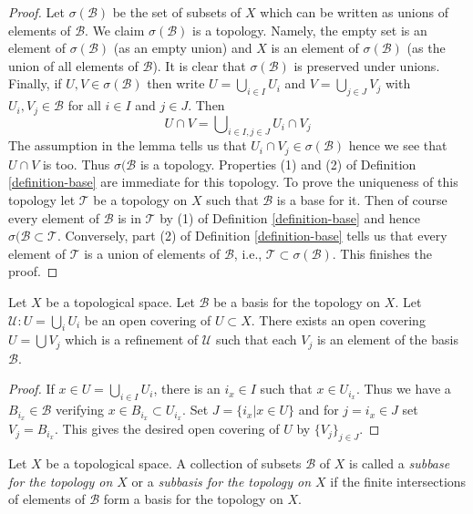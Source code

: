 \begin{proof}
Let $\sigma(\mathcal B)$ be the set of subsets of $X$ which can be written
as unions of elements of $\mathcal B$. We claim $\sigma(\mathcal{B})$
is a topology. Namely, the empty set is an element of $\sigma(\mathcal{B})$
(as an empty union) and $X$ is an element of $\sigma(\mathcal{B})$ (as the
union of all elements of $\mathcal{B}$). It is clear that $\sigma(\mathcal{B})$
is preserved under unions. Finally, if $U, V \in \sigma(\mathcal{B})$
then write $U = \bigcup_{i \in I} U_i$ and $V = \bigcup_{j \in J} V_j$
with $U_i, V_j \in \mathcal{B}$ for all $i \in I$ and $j \in J$.
Then
$$
U \cap V = \bigcup\nolimits_{i \in I, j \in J}
U_i \cap V_j
$$
The assumption in the lemma tells us that $U_i \cap V_j \in \sigma(\mathcal{B})$
hence we see that $U \cap V$ is too. Thus $\sigma(\mathcal{B}$ is a topology.
Properties (1) and (2) of Definition \ref{definition-base} are
immediate for this topology. To prove the uniqueness of this topology
let $\mathcal T$ be a topology on $X$ such that $\mathcal B$ is a base for it.
Then of course every element of $\mathcal{B}$ is in $\mathcal{T}$ by
(1) of Definition \ref{definition-base} and
hence $\sigma(\mathcal{B} \subset \mathcal{T}$. Conversely, part
(2) of Definition \ref{definition-base} tells us that every element
of $\mathcal{T}$ is a union of elements of $\mathcal{B}$, i.e.,
$\mathcal{T} \subset \sigma(\mathcal{B})$. This finishes the proof.
\end{proof}

\begin{lemma}
\label{lemma-refine-covering-basis}
Let $X$ be a topological space.
Let $\mathcal{B}$ be a basis for the topology on $X$.
Let $\mathcal{U} : U = \bigcup_i U_i$ be an open covering of
$U \subset X$. There exists an open covering $U = \bigcup V_j$
which is a refinement of $\mathcal{U}$ such that each
$V_j$ is an element of the basis $\mathcal{B}$.
\end{lemma}

\begin{proof}
If $ x \in U = \bigcup_{i\in I} U_i $, there is an $ i_x \in I $ such that
$ x \in U_{i_x} $. Thus we have a $ B_{i_x} \in \mathcal{B}$
verifying $ x \in B_{i_x} \subset U_{i_x}$. Set
$J = \{i_x | x \in U\}$ and for $j = i_x \in J$ set $V_j = B_{i_x}$.
This gives the desired open covering of $U$ by $\{V_j\}_{j \in J}$.
\end{proof}

\begin{definition}
\label{definition-subbase}
Let $X$ be a topological space. A collection of subsets $\mathcal{B}$ of $X$
is called a {\it subbase for the topology on $X$} or a {\it subbasis for the
topology on $X$} if the finite intersections of
elements of $\mathcal{B}$ form a basis for the topology on $X$.
\end{definition}

